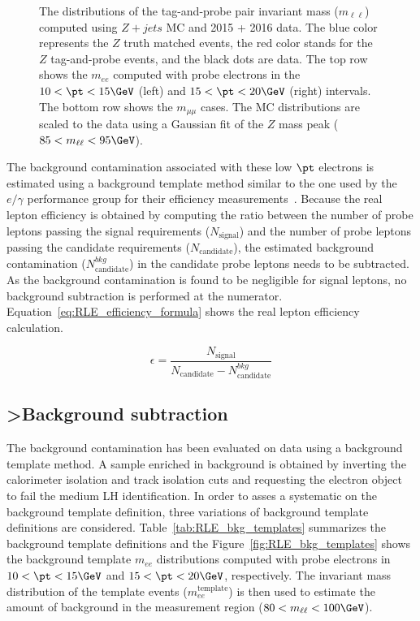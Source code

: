 \begin{figure}[htbp]
\caption{The distributions of the tag-and-probe pair invariant mass ($m_{\ell\ell}$) computed using $Z+jets$ MC and 2015 + 2016 data.
The blue color represents the $Z$ truth matched events, the red color stands for the $Z$ tag-and-probe events, and the black dots are data.
The top row shows the $m_{ee}$ computed with probe electrons in the $10<\pt<15 \GeV$ (left) and $15<\pt<20 \GeV$ (right) intervals.
The bottom row shows the $m_{\mu\mu}$ cases.
The MC distributions are scaled to the data using a Gaussian fit of the $Z$ mass peak ($85<m_{\ell\ell}<95 \GeV$).}
\label{fig:RLE_mll_distributions}
\end{figure}

The background contamination associated with these low $\pt$ electrons is estimated using a background template method similar to the one used by the $e/\gamma$ performance group for their efficiency measurements~\cite{ATLAS-CONF-2014-018}.
Because the real lepton efficiency is obtained by computing the ratio between the number of probe leptons passing the signal requirements ($N_{\textrm{signal}}$) and the number of probe leptons passing the candidate requirements ($N_{\textrm{candidate}}$), the estimated background contamination ($N_{\textrm{candidate}}^{bkg}$) in the candidate probe leptons needs to be subtracted.
As the background contamination is found to be negligible for signal leptons, no background subtraction is performed at the numerator.
Equation~\ref{eq:RLE_efficiency_formula} shows the real lepton efficiency calculation.

\begin{equation}
\epsilon = \frac{N_{\textrm{signal}}}{N_{\textrm{candidate}} - N_{\textrm{candidate}}^{bkg}}
\label{eq:RLE_efficiency_formula}
\end{equation}



\subsection{>Background subtraction}
\label{subsubsec:RLE_bkg_contamination}

The background contamination has been evaluated on data using a background template method.
A sample enriched in background is obtained by inverting the calorimeter isolation and track isolation cuts and requesting the electron object to fail the medium LH identification.
In order to asses a systematic on the background template definition, three variations of background template definitions are considered.
Table~\ref{tab:RLE_bkg_templates} summarizes the background template definitions and the Figure~\ref{fig:RLE_bkg_templates} shows the background template $m_{ee}$ distributions computed with probe electrons in $10<\pt<15 \GeV$ and $15<\pt<20 \GeV$, respectively.
The invariant mass distribution of the template events ($m_{ee}^{\textrm{template}}$) is then used to estimate the amount of background in the measurement region ($80<m_{\ell\ell}<100 \GeV$).

